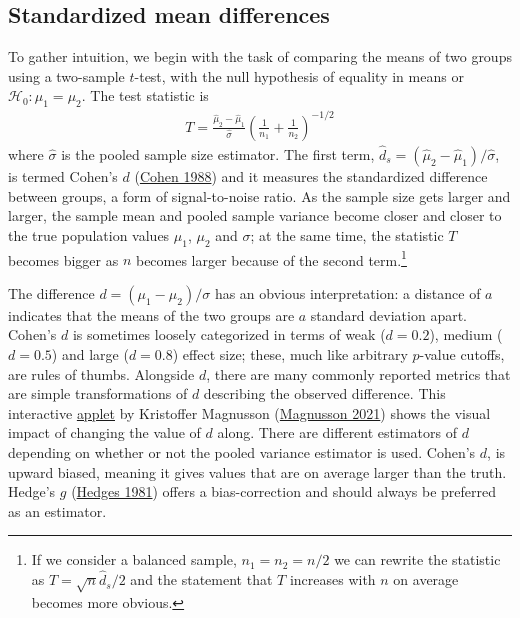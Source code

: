 \documentclass[
  11pt,
  letterpaper,
]{scrbook}
\theoremstyle{definition}
\theoremstyle{remark}
\begin{document}
\hypertarget{standardized-mean-differences}{%
\subsection{Standardized mean
differences}\label{standardized-mean-differences}}

To gather intuition, we begin with the task of comparing the means of
two groups using a two-sample \(t\)-test, with the null hypothesis of
equality in means or \(\mathscr{H}_0: \mu_1 = \mu_2\). The test
statistic is \begin{align*}
T =  \frac{\widehat{\mu}_2 - \widehat{\mu}_1}{\widehat{\sigma}} \left(\frac{1}{n_1}+\frac{1}{n_2}\right)^{-1/2}
\end{align*} where \(\widehat{\sigma}\) is the pooled sample size
estimator. The first term,
\(\widehat{d}_s = (\widehat{\mu}_2 - \widehat{\mu}_1)/\widehat{\sigma}\),
is termed Cohen's \(d\) (\protect\hyperlink{ref-Cohen:1988}{Cohen 1988})
and it measures the standardized difference between groups, a form of
signal-to-noise ratio. As the sample size gets larger and larger, the
sample mean and pooled sample variance become closer and closer to the
true population values \(\mu_1\), \(\mu_2\) and \(\sigma\); at the same
time, the statistic \(T\) becomes bigger as \(n\) becomes larger because
of the second term.\footnote{If we consider a balanced sample,
  \(n_1 = n_2 = n/2\) we can rewrite the statistic as
  \(T = \sqrt{n} \widehat{d}_s/2\) and the statement that \(T\)
  increases with \(n\) on average becomes more obvious.}

The difference \(d=(\mu_1-\mu_2)/\sigma\) has an obvious interpretation:
a distance of \(a\) indicates that the means of the two groups are \(a\)
standard deviation apart. Cohen's \(d\) is sometimes loosely categorized
in terms of weak (\(d = 0.2\)), medium (\(d=0.5\)) and large (\(d=0.8\))
effect size; these, much like arbitrary \(p\)-value cutoffs, are rules
of thumbs. Alongside \(d\), there are many commonly reported metrics
that are simple transformations of \(d\) describing the observed
difference. This interactive
\href{https://rpsychologist.com/cohend/}{applet} by Kristoffer Magnusson
(\protect\hyperlink{ref-magnussonCohend}{Magnusson 2021}) shows the
visual impact of changing the value of \(d\) along. There are different
estimators of \(d\) depending on whether or not the pooled variance
estimator is used. Cohen's \(d\), is upward biased, meaning it gives
values that are on average larger than the truth. Hedge's \(g\)
(\protect\hyperlink{ref-Hedges:1981}{Hedges 1981}) offers a
bias-correction and should always be preferred as an estimator.
\end{document}
